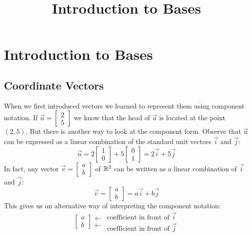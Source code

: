 \documentclass{ximera}
\title{Introduction to Bases} \license{CC BY-NC-SA 4.0}
\begin{document}
\begin{abstract}

\end{abstract}
\maketitle

\section*{Introduction to Bases}
\subsection*{Coordinate Vectors}
When we first introduced vectors we learned to represent them using component notation.  If $\vec{u}=\begin{bmatrix}2\\5\end{bmatrix}$ we know that the head of $\vec{u}$ is located at the point $(2, 5)$.  But there is another way to look at the component form.  Observe that $\vec{u}$ can be expressed as a linear combination of the standard unit vectors $\vec{i}$ and $\vec{j}$:
$$\vec{u}=2\begin{bmatrix}1\\0\end{bmatrix}+5\begin{bmatrix}0\\1\end{bmatrix}=2\vec{i}+5\vec{j}$$
In fact, any vector $\vec{v}=\begin{bmatrix}a\\b\end{bmatrix}$ of $\mathbb{R}^2$ can be written as a linear combination of $\vec{i}$ and $\vec{j}$:
$$\vec{v}=\begin{bmatrix}a\\b\end{bmatrix}=a\vec{i}+b\vec{j}$$
This gives us an alternative way of interpreting the component notation:
$$\left[\begin{array}{c}  
 a\\b
 \end{array}\right]
 \begin{array}{c}
 \longleftarrow\\
 \longleftarrow
 \end{array}
\begin{array}{c}  
 \mbox{coefficient in front of $\vec{i}$}\\\mbox{coefficient in front of $\vec{j}$}
 \end{array}$$
 
\end{document}
